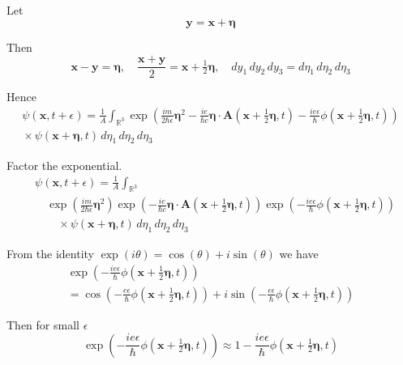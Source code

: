 \documentclass[12pt]{article}
\newcommand\INT{\int_{\mathbb R^3}}
\begin{document}
Let
\begin{equation*}
\mathbf y=\mathbf x+\boldsymbol\eta
\end{equation*}

Then
\begin{equation*}
\mathbf x-\mathbf y=\boldsymbol\eta,\quad
\frac{\mathbf x+\mathbf y}{2}=\mathbf{x}+\tfrac{1}{2}\boldsymbol\eta,\quad
dy_1\,dy_2\,dy_3=d\eta_1\,d\eta_2\,d\eta_3
\end{equation*}

Hence
\begin{multline*}
\psi(\mathbf x,t+\epsilon)=
\frac{1}{A}\INT\exp
\left(
\frac{im}{2\hbar\epsilon}\boldsymbol\eta^2
-\frac{ie}{\hbar c}\boldsymbol\eta\cdot\mathbf A\left(\mathbf x+\tfrac{1}{2}\boldsymbol\eta,t\right)
-\frac{ie\epsilon}{\hbar}\phi\left(\mathbf x+\tfrac{1}{2}\boldsymbol\eta,t\right)
\right)
\\
{}\times\psi(\mathbf x+\boldsymbol\eta,t)
\,d\eta_1\,d\eta_2\,d\eta_3
\end{multline*}

Factor the exponential.
\begin{align*}
&\psi(\mathbf x,t+\epsilon)=
\frac{1}{A}\INT
\\
&\quad{}\exp\left(\frac{im}{2\hbar\epsilon}\boldsymbol\eta^2\right)
\exp\left(-\frac{ie}{\hbar c}\boldsymbol\eta\cdot\mathbf A\left(\mathbf x+\tfrac{1}{2}\boldsymbol\eta,t\right)\right)
\exp\left(-\frac{ie\epsilon}{\hbar}\phi\left(\mathbf x+\tfrac{1}{2}\boldsymbol\eta,t\right)\right)
\\
&\quad\quad{}\times\psi(\mathbf x+\boldsymbol\eta,t)
\,d\eta_1\,d\eta_2\,d\eta_3
\tag{2}
\end{align*}

From the identity $\exp(i\theta)=\cos(\theta)+i\sin(\theta)$ we have
\begin{multline*}
\exp\left(-\frac{ie\epsilon}{\hbar}\phi\left(\mathbf x+\tfrac{1}{2}\boldsymbol\eta,t\right)\right)
\\
=\cos\left(-\frac{e\epsilon}{\hbar}\phi\left(\mathbf x+\tfrac{1}{2}\boldsymbol\eta,t\right)\right)
+i\sin\left(-\frac{e\epsilon}{\hbar}\phi\left(\mathbf x+\tfrac{1}{2}\boldsymbol\eta,t\right)\right)
\end{multline*}

Then for small $\epsilon$
\begin{equation*}
\exp\left(-\frac{ie\epsilon}{\hbar}\phi\left(\mathbf x+\tfrac{1}{2}\boldsymbol\eta,t\right)\right)
\approx
1-\frac{ie\epsilon}{\hbar}\phi\left(\mathbf x+\tfrac{1}{2}\boldsymbol\eta,t\right)
\end{equation*}
\end{document}

